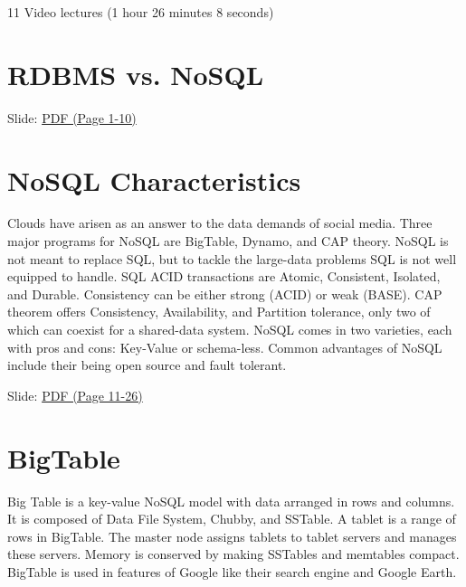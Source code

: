 
  11 Video lectures (1 hour 26 minutes 8 seconds)

\section{RDBMS vs. NoSQL}


  Slide:
  \href{https://drive.google.com/open?id=0B88HKpainTSfaDFNbjNiMm44bnc}{PDF
  (Page 1-10)}

\section{NoSQL Characteristics}

Clouds have arisen as an answer to the data demands of social media.
Three major programs for NoSQL are BigTable, Dynamo, and CAP theory.
NoSQL is not meant to replace SQL, but to tackle the large-data problems
SQL is not well equipped to handle. SQL ACID transactions are Atomic,
Consistent, Isolated, and Durable. Consistency can be either strong
(ACID) or weak (BASE). CAP theorem offers Consistency, Availability, and
Partition tolerance, only two of which can coexist for a shared-data
system. NoSQL comes in two varieties, each with pros and cons: Key-Value
or schema-less. Common advantages of NoSQL include their being open
source and fault tolerant.


  Slide:
  \href{https://drive.google.com/open?id=0B88HKpainTSfaDFNbjNiMm44bnc}{PDF
  (Page 11-26)}

\section{BigTable}

Big Table is a key-value NoSQL model with data arranged in rows and
columns. It is composed of Data File System, Chubby, and SSTable. A
tablet is a range of rows in BigTable. The master node assigns tablets
to tablet servers and manages these servers. Memory is conserved by
making SSTables and memtables compact. BigTable is used in features of
Google like their search engine and Google Earth.


